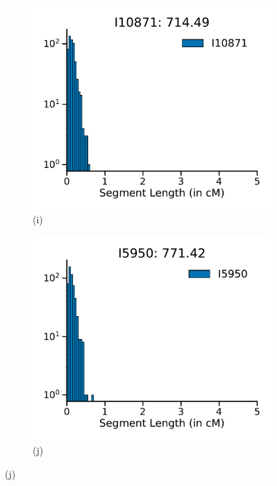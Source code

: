 \begin{figure}[htbp]
    \captionsetup{labelformat=empty} 
    \centering
    \begin{subfigure}[b]{0.4\textwidth}
        \includegraphics[width=\textwidth]{figures/gb_bta/segment_length/segment_lengths_histogram_I10871.pdf}
        \caption*{(i)}
    \end{subfigure}
    \hfill
    \begin{subfigure}[b]{0.4\textwidth}
        \includegraphics[width=\textwidth]{figures/gb_bta/segment_length/segment_lengths_histogram_I5950.pdf}
        \caption*{(j)}
    \end{subfigure}


\end{figure}
